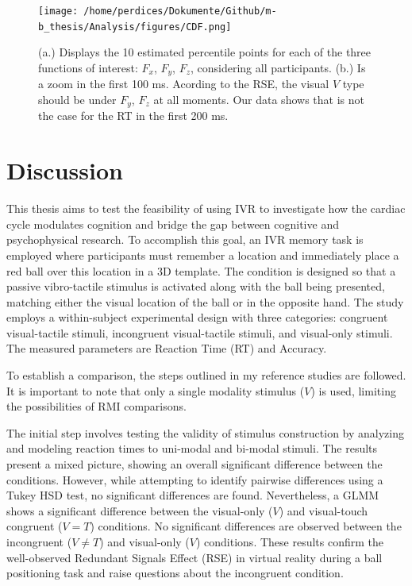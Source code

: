 \documentclass[12pt,oneside,openright]{report}
\begin{document}
\begin{figure}[!ht]
    \centering
    \texttt{[image: /home/perdices/Dokumente/Github/m-b\_thesis/Analysis/figures/CDF.png]}
    \caption{ (a.) Displays the 10 estimated percentile points for each of the three functions of interest: $F_x$, $F_y$, $F_z$, considering all participants. (b.) Is a zoom in the first 100 ms. Acording to the RSE, the visual $V$ type should be under $F_y$, $F_z$ at all moments. Our data shows that is not the case for the RT in the first 200 ms.}
    \label{fig:CDF}
\end{figure}


\section*{Discussion}

This thesis aims to test the feasibility of using IVR to investigate how the cardiac cycle modulates cognition and bridge the gap between cognitive and psychophysical research. To accomplish this goal, an IVR memory task is employed where participants must remember a location and immediately place a red ball over this location in a 3D template. The condition is designed so that a passive vibro-tactile stimulus is activated along with the ball being presented, matching either the visual location of the ball or in the opposite hand. The study employs a within-subject experimental design with three categories: congruent visual-tactile stimuli, incongruent visual-tactile stimuli, and visual-only stimuli. The measured parameters are Reaction Time (RT) and Accuracy.

To establish a comparison, the steps outlined in my reference studies \parencite{Innes2019ACA, SALTAFOSSI2023108642, Ulrich2007} are followed. It is important to note that only a single modality stimulus ($V$) is used, limiting the possibilities of RMI comparisons.

The initial step involves testing the validity of stimulus construction by analyzing and modeling reaction times to uni-modal and bi-modal stimuli. The results present a mixed picture, showing an overall significant difference between the conditions. However, while attempting to identify pairwise differences using a Tukey HSD test, no significant differences are found. Nevertheless, a GLMM shows a significant difference between the visual-only ($V$) and visual-touch congruent ($V=T$) conditions. No significant differences are observed between the incongruent ($V \neq T$) and visual-only ($V$) conditions. These results confirm the well-observed Redundant Signals Effect (RSE) in virtual reality during a ball positioning task and raise questions about the incongruent condition.
\end{document}
